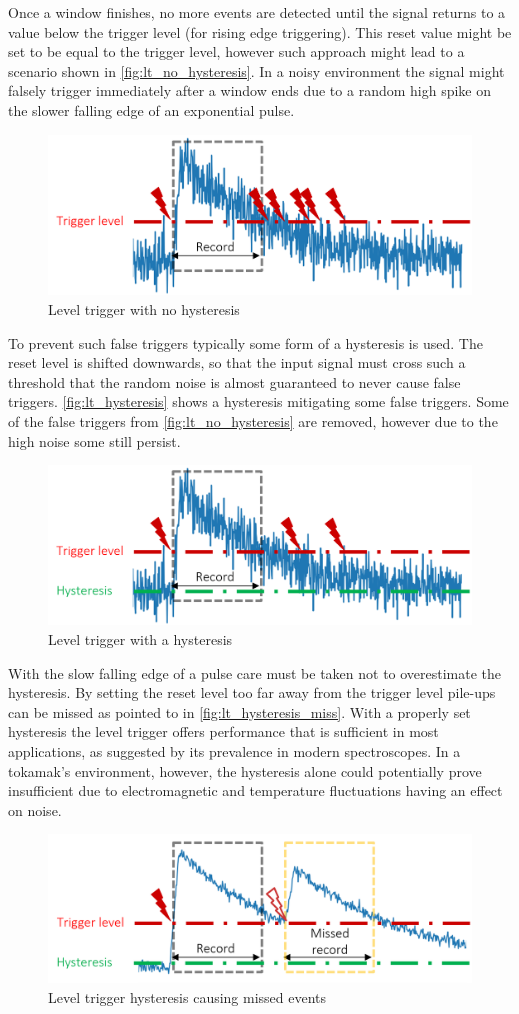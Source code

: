 Once a window finishes, no more events are detected
until the signal returns to a value below the trigger level
(for rising edge triggering). This reset value might be 
set to be equal to the trigger level, however such approach
might lead to a scenario shown in \autoref{fig:lt_no_hysteresis}.
In a noisy environment the signal might falsely trigger immediately after
a window ends due to a random high spike on the slower falling edge of
an exponential pulse.
\begin{figure}[H]
  \centering
  \includegraphics[width=.5\linewidth]{media/lt_no_hysteresis.png}
  \caption{Level trigger with no hysteresis}
  \label{fig:lt_no_hysteresis}
\end{figure}

To prevent such false triggers typically some form of a hysteresis is used.
The reset level is shifted downwards, so that the input signal must cross
such a threshold that the random noise is almost guaranteed to never cause false 
triggers. \autoref{fig:lt_hysteresis} shows a hysteresis mitigating some false triggers.
Some of the false triggers from \autoref{fig:lt_no_hysteresis} are removed, however 
due to the high noise some still persist.
\begin{figure}[H]
  \centering
  \includegraphics[width=.5\linewidth]{media/lt_hysteresis.png}
  \caption{Level trigger with a hysteresis}
  \label{fig:lt_hysteresis} 
\end{figure}

With the slow falling edge of a pulse care must be taken not to 
overestimate the hysteresis. By setting the reset level too far away
from the trigger level pile-ups can be missed as pointed to in
\autoref{fig:lt_hysteresis_miss}. With a properly set hysteresis
the level trigger offers performance that is sufficient in most applications,
as suggested by its prevalence in modern spectroscopes.
In a tokamak's environment, however, the hysteresis
alone could potentially prove insufficient due to 
electromagnetic and temperature fluctuations having an effect on noise.
\begin{figure}[H]
  \centering
  \includegraphics[width=.5\linewidth]{media/lt_hysteresis_miss.png}
  \caption{Level trigger hysteresis causing missed events}
  \label{fig:lt_hysteresis_miss} 
\end{figure}
